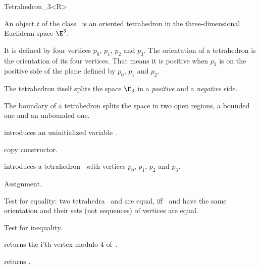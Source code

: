 \begin{ccRefClass} {Tetrahedron_3<R>}


\ccDefinition  An object $t$ of the class \ccRefName\ is an oriented
tetrahedron in the three-dimensional Euclidean space $\E^3$. 

It is defined by four vertices $p_0$, $p_1$, $p_2$ and $p_3$.
The orientation of a tetrahedron is the orientation of its four 
vertices. That means it is positive when $p_3$ is on the positive
side of the plane defined by $p_0$, $p_1$ and $p_2$.

The tetrahedron itself splits the space $\E_3$ in a {\em positive} and
a {\em negative} side.
 
The boundary of a tetrahedron splits the space in two open regions, a
bounded one and an unbounded one.

\ccCreation
{}


\ccHidden {}
             {introduces an uninitialized variable \ccVar.}

\ccHidden {}
 	    {copy constructor.}


            {introduces a tetrahedron \ccVar\ with vertices $p_0$, $p_1$, $p_2$ and $p_3$.}


\ccOperations

\ccHidden {}
        {Assignment.}

       {Test for equality: two tetrahedra \ccVar\ and  are equal, 
        iff \ccVar\ and  have the same orientation and 
        their sets (not sequences) of vertices are equal.}

       {Test for inequality.}

       {returns the i'th vertex modulo 4  of~\ccVar.}

       {returns .}


\end{ccRefClass}
